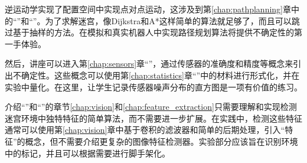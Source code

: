 逆运动学实现了配置空间中实现点对点运动，这涉及到第\ref{chap:pathplanning}章中的“”和“”。为了求解迷宫，像Dijkstra和A*这样简单的算法就足够了，而且可以跳过基于抽样的方法。在模拟和真实机器人中实现路径规划算法将提供不确定性的第一手体验。


然后，讲座可以进入第\ref{chap:sensors}章“”，通过传感器的准确度和精度等概念来引出不确定性。这些概念可以使用第\ref{chap:statistics}章“”中的材料进行形式化，并在实验中量化。在这里，让学生记录传感器噪声分布的直方图是一项有价值的练习。


介绍“”和“”的章节\ref{chap:vision}和\ref{chap:feature_extraction}只需要理解和实现检测迷宫环境中独特特征的简单算法，而不需要进一步扩展。在实践中，检测这些特征通常可以使用第\ref{chap:vision}章中基于卷积的滤波器和简单的后期处理，引入“特征”的概念，但不需要介绍更复杂的图像特征检测器。实验部分应该旨在识别环境中的标记，并且可以根据需要进行脚手架化。


